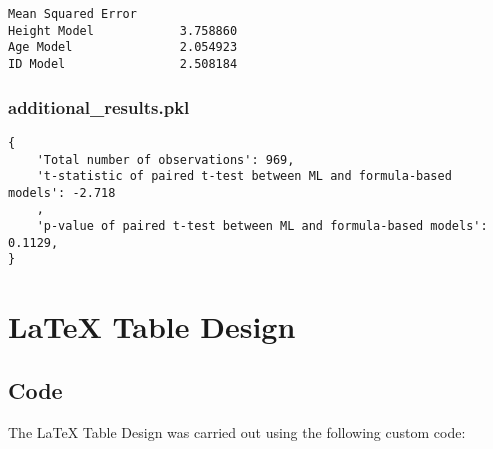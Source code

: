 \documentclass[11pt]{article}
\begin{document}
\begin{Verbatim}[tabsize=4]
              Mean Squared Error
Height Model            3.758860
Age Model               2.054923
ID Model                2.508184
\end{Verbatim}

\subsubsection*{additional\_results.pkl}

\begin{Verbatim}[tabsize=4]
{
    'Total number of observations': 969,
    't-statistic of paired t-test between ML and formula-based models': -2.718
	,
    'p-value of paired t-test between ML and formula-based models': 0.1129,
}
\end{Verbatim}

\section{LaTeX Table Design}
\subsection{{Code}}
The LaTeX Table Design was carried out using the following custom code:
\end{document}
